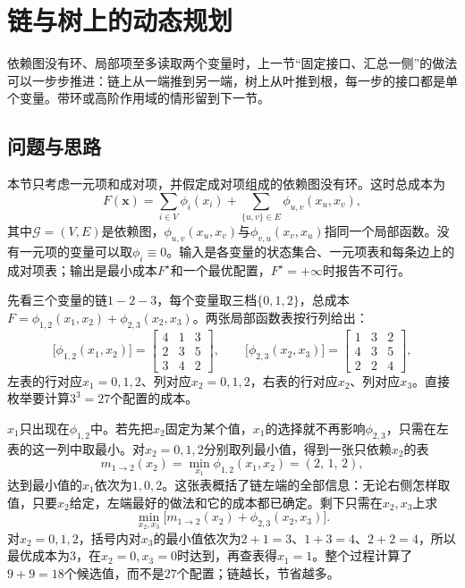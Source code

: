 
\section{链与树上的动态规划}
\label{sec:graph-tree-dp}

依赖图没有环、局部项至多读取两个变量时，上一节“固定接口、汇总一侧”的做法可以一步步推进：链上从一端推到另一端，树上从叶推到根，每一步的接口都是单个变量。带环或高阶作用域的情形留到下一节。

\subsection{问题与思路}
\label{sec:graph-dp-tree-idea}

本节只考虑一元项和成对项，并假定成对项组成的依赖图没有环。这时总成本为
\begin{equation}
F(\bm x)=\sum_{i\in V}\phi_i(x_i)+\sum_{\{u,v\}\in E}\phi_{u,v}(x_u,x_v),
\label{eq:graph-dp-pairwise-cost}
\end{equation}
其中$\mathcal G=(V,E)$是依赖图，$\phi_{u,v}(x_u,x_v)$与$\phi_{v,u}(x_v,x_u)$指同一个局部函数。没有一元项的变量可以取$\phi_i\equiv0$。输入是各变量的状态集合、一元项表和每条边上的成对项表；输出是最小成本$F^\star$和一个最优配置，$F^\star=+\infty$时报告不可行。

先看三个变量的链$1-2-3$，每个变量取三档$\{0,1,2\}$，总成本$F=\phi_{1,2}(x_1,x_2)+\phi_{2,3}(x_2,x_3)$。两张局部函数表按行列给出：
\[
\bigl[\phi_{1,2}(x_1,x_2)\bigr]=\begin{bmatrix}4&1&3\\2&3&5\\3&4&2\end{bmatrix},\qquad
\bigl[\phi_{2,3}(x_2,x_3)\bigr]=\begin{bmatrix}1&3&2\\4&3&5\\2&2&4\end{bmatrix},
\]
左表的行对应$x_1=0,1,2$、列对应$x_2=0,1,2$，右表的行对应$x_2$、列对应$x_3$。直接枚举要计算$3^3=27$个配置的成本。

$x_1$只出现在$\phi_{1,2}$中。若先把$x_2$固定为某个值，$x_1$的选择就不再影响$\phi_{2,3}$，只需在左表的这一列中取最小。对$x_2=0,1,2$分别取列最小值，得到一张只依赖$x_2$的表
\[
m_{1\to2}(x_2)=\min_{x_1}\phi_{1,2}(x_1,x_2)=(2,\,1,\,2),
\]
达到最小值的$x_1$依次为$1,0,2$。这张表概括了链左端的全部信息：无论右侧怎样取值，只要$x_2$给定，左端最好的做法和它的成本都已确定。剩下只需在$x_2,x_3$上求
\[
\min_{x_2,x_3}\bigl[m_{1\to2}(x_2)+\phi_{2,3}(x_2,x_3)\bigr].
\]
对$x_2=0,1,2$，括号内对$x_3$的最小值依次为$2+1=3$、$1+3=4$、$2+2=4$，所以最优成本为$3$，在$x_2=0,x_3=0$时达到，再查表得$x_1=1$。整个过程计算了$9+9=18$个候选值，而不是$27$个配置；链越长，节省越多。

